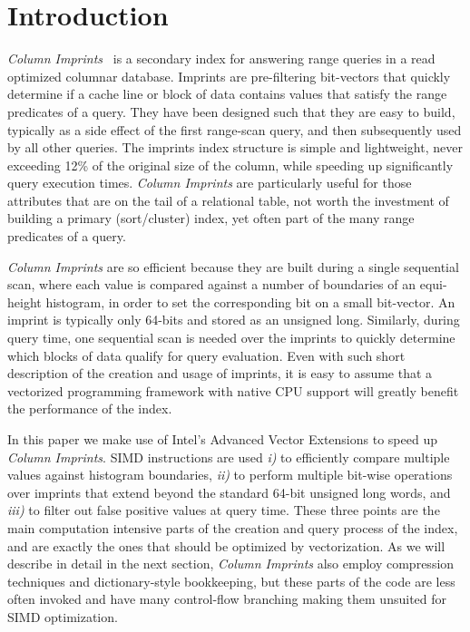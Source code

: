 \documentclass[sigconf]{acmart}
\begin{document}




\maketitle

\section{Introduction}

{\em Column Imprints}~\cite{DBLP:conf/sigmod/SidirourgosK13} is a secondary index
for answering range queries in a read optimized columnar database. Imprints are
pre-filtering bit-vectors that quickly determine if a cache line or block of data
contains values that satisfy the range predicates of a query. They have been designed
such that they are easy to build, typically as a side effect of the first range-scan query,
and then subsequently used by all other queries. The imprints index structure is simple
and lightweight, never exceeding 12\% of the original size of the column, while speeding
up significantly query execution times. {\em Column Imprints} are particularly useful for those
attributes that are on the tail of a relational table, not worth the investment of building
a primary (sort/cluster) index, yet often part of the many range predicates of a query.

{\em Column Imprints} are so efficient because they are built during a single 
sequential scan, where each value is compared against a number of boundaries
of an equi-height histogram, in order to set the corresponding bit on a small bit-vector.
An imprint is typically only 64-bits and stored as an unsigned long. Similarly,
during query time, one sequential scan is needed over the imprints to quickly determine
which blocks of data qualify for query evaluation. Even with such short description of
the creation and usage of imprints, it is easy to assume that a vectorized programming
framework with native CPU support will greatly benefit the performance of the index.

In this paper we make use of Intel's Advanced Vector Extensions 
\cite{IntelManual2011} to speed up {\em Column Imprints}. SIMD instructions are used 
{\em i)} to efficiently compare multiple values against histogram boundaries, {\em ii)} to perform 
multiple bit-wise operations over imprints that extend beyond the
standard 64-bit unsigned long words, and {\em iii)} to filter out false positive 
values at query time. These three points are the main computation intensive parts
of the  creation and query process of the index, and are exactly the ones that should be 
optimized by vectorization. As we will describe in detail in the next section, 
{\em Column Imprints} also employ compression techniques and dictionary-style bookkeeping,
but these parts of the code are less often invoked and have many control-flow branching 
making them unsuited for SIMD optimization.
\end{document}
